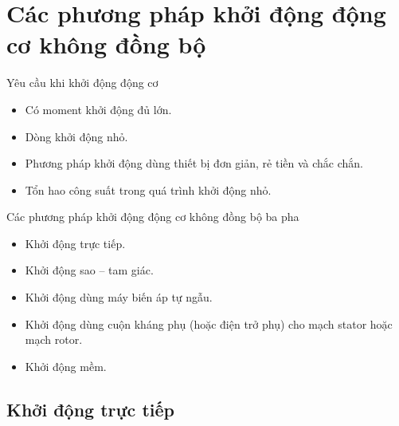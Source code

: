 \documentclass[17pt]{beamer}
\begin{document}
\section[Các phương pháp khởi động]{Các phương pháp khởi động động cơ không đồng bộ}
\begin{frame}[t]{Yêu cầu khi khởi động động cơ}
\justifying
\begin{itemize}
\item Có moment khởi động đủ lớn.
\item Dòng khởi động nhỏ.
\item Phương pháp khởi động dùng thiết bị đơn giản, rẻ tiền và chắc chắn.
\item Tổn hao công suất trong quá trình khởi động nhỏ.
\end{itemize}
\end{frame}

\begin{frame}{Các phương pháp khởi động động cơ không đồng bộ ba pha}
\begin{itemize}
\item Khởi động trực tiếp.
\item Khởi động sao -- tam giác.
\item Khởi động dùng máy biến áp tự ngẫu.
\item Khởi động dùng cuộn kháng phụ (hoặc điện trở phụ) cho mạch stator hoặc mạch rotor.
\item Khởi động mềm.
\end{itemize}
\end{frame}

\subsection*{Khởi động trực tiếp}
\end{document}
